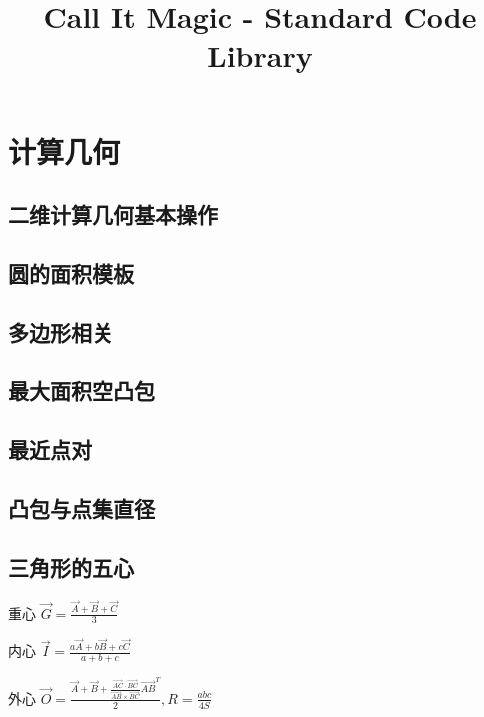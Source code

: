 \documentclass[10pt, a4paper]{article}
\begin{document}
\title{Call It Magic - Standard Code Library}
\date{}
\tableofcontents
\newpage

\section{计算几何}

	\subsection{二维计算几何基本操作}
		
		
	\subsection{圆的面积模板}
		

	\subsection{多边形相关}
		

	\subsection{最大面积空凸包}
		

	\subsection{最近点对}
		

	\subsection{凸包与点集直径}
		

	\subsection{三角形的五心}
		重心 $\overrightarrow{G} = \frac{\overrightarrow{A} + \overrightarrow{B} + \overrightarrow{C}}{3}$

		内心 $\overrightarrow{I} = \frac{a\overrightarrow{A} + b\overrightarrow{B} + c\overrightarrow{C}}{a + b + c}$

		外心 $\overrightarrow{O} = \frac{\overrightarrow{A} + \overrightarrow{B} + \frac{\overrightarrow{AC} \cdot \overrightarrow{BC}}{\overrightarrow{AB} \times \overrightarrow{BC}} \overrightarrow{AB}^{T}}{2}, R = \frac{abc}{4S}$
\end{document}
